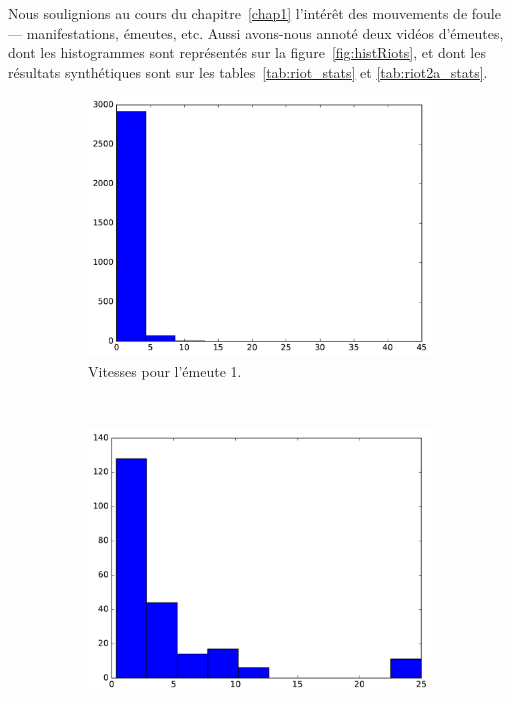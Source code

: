 	Nous soulignions au cours du chapitre~\ref{chap1} l'intérêt des mouvements de foule --- manifestations, émeutes, etc. Aussi avons-nous annoté deux vidéos d'émeutes, dont les histogrammes sont représentés sur la figure~\ref{fig:histRiots}, et dont les résultats synthétiques sont sur les tables~\ref{tab:riot_stats} et \ref{tab:riot2a_stats}.

	\begin{figure}[htb]
		\begin{subfigure}[t]{\subImgWclicks}
			\centering
			\includegraphics[width=\textwidth]{figures/ch3/riot_speed}
			\caption{Vitesses pour l'émeute 1.}
			\label{fig:riot_speed}
		\end{subfigure}
		~
		\begin{subfigure}[t]{\subImgWclicks}
			\centering
			\includegraphics[width=\textwidth]{figures/ch3/riot_frequency}

\end{subfigure}
\end{figure}
